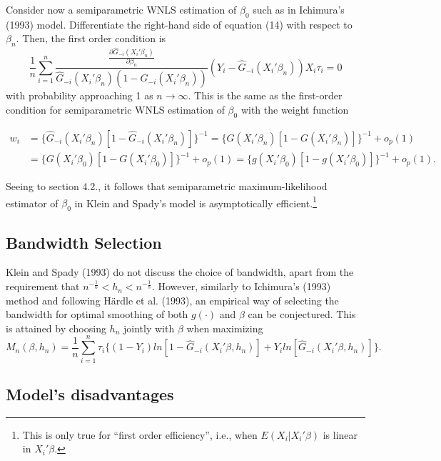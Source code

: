 \documentclass[a4paper]{article}
\begin{document}
Consider now a semiparametric WNLS estimation of $\beta_0$ such as in Ichimura's (1993) model. Differentiate the right-hand side of equation (14) with respect to $\beta_n$. Then, the first order condition is
\begin{equation}
\frac{1}{n} \sum_{i=1}^n \frac{\frac{\partial\hat{G}_{-i}(X_i'\beta_n)}{\partial \beta_n}}{\hat{G}_{-i}(X_i'\beta_n)(1 - \hat{G}_{-i}(X_i'\beta_n))} (Y_i - \hat{G}_{-i}(X_i'\beta_n)) X_i \tau_i = 0
\end{equation} 
with probability approaching 1 as $n \rightarrow \infty$. This is the same as the first-order condition for semiparametric WNLS estimation of $\beta_0$ with the weight function

\begin{align*}
w_i & = \{ \hat{G}_{-i}(X_i'\beta_n)[ 1 - \hat{G}_{-i}(X_i'\beta_n)]\}^{-1} = \{ G(X_i'\beta_n)[ 1 - G(X_i'\beta_n)]\}^{-1} + o_p(1) \\
     & = \{ G(X_i'\beta_0)[ 1 - G(X_i'\beta_0)]\}^{-1} + o_p(1) = \{ g(X_i'\beta_0)[ 1 - g(X_i'\beta_0)]\}^{-1} + o_p(1).
\end{align*}


Seeing to section 4.2., it follows that semiparametric maximum-likelihood estimator of $\beta_0$ in Klein and Spady's model is asymptotically efficient.\footnote{This is only true for ``first order efficiency'', i.e., when $E(X_i|X_i'\beta)$ is linear in $X_i'\beta$.}

\subsection{Bandwidth Selection} %
\label{sub:Bandwidth Selection}

Klein and Spady (1993) do not discuss the choice of bandwidth, apart from the requirement that $ n^{-\frac{1}{6}} < h_n < n^{-\frac{1}{8}}$. However, similarly to Ichimura's (1993) method and following H{\"a}rdle et al. (1993), an empirical way of selecting the bandwidth for optimal smoothing of both $g(\cdot)$ and $\beta$ can be conjectured. This is attained by choosing $h_n$ jointly with $\beta$ when maximizing
\begin{equation}
M_n(\beta, h_n) = \frac{1}{n}\sum_{i=1}^n \tau_{i}\{ (1 - Y_i)ln[ 1 - \hat{G}_{-i}(X_i'\beta, h_n)] +  Y_iln[\hat{G}_{-i}(X_i'\beta, h_n)]\}.
\end{equation}

\subsection{Model's disadvantages} %
\label{sub:Model's disadvantages}
\end{document}
